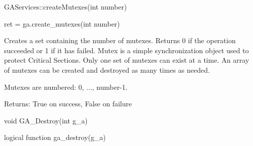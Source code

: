 \documentclass[12pt]{article}
\begin{document}
\begin{cxxapi}
\begin{cxxcode}
GAServices::createMutexes(int number)
\end{cxxcode}
\begin{funcargs}
\end{funcargs}
\end{cxxapi}

\begin{pyapi}
\begin{pycode}
ret = ga.create_mutexes(int number)
\end{pycode}
\begin{funcargs}
\end{funcargs}
\end{pyapi}

\wcoll

\begin{desc}

Creates a set containing the number of mutexes. Returns 0 if the operation
succeeded or 1 if it has failed. Mutex is a simple synchronization object used
to protect Critical Sections. Only one set of mutexes can exist at a time. An
array of mutexes can be created and destroyed as many times as needed.

Mutexes are numbered: 0, ..., number-1.

Returns: True on success, False on failure

\end{desc}



\begin{capi}
\begin{ccode}
void GA_Destroy(int g_a)
\end{ccode}
\begin{funcargs}
\end{funcargs}
\end{capi}

\begin{fapi}
\begin{fcode}
logical function ga_destroy(g_a)
\end{fcode}
\begin{funcargs}
\end{funcargs}
\end{fapi}
\end{document}
